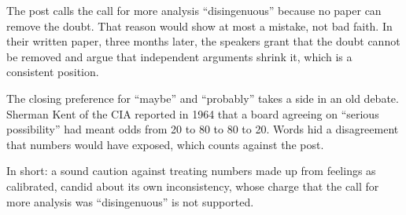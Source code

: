 \begin{afterword}
The post calls the call for more analysis ``disingenuous'' because no paper can remove the doubt. That reason would show at most a mistake, not bad faith. In their written paper, three months later, the speakers grant that the doubt cannot be removed and argue that independent arguments shrink it, which is a consistent position.

The closing preference for ``maybe'' and ``probably'' takes a side in an old debate. Sherman Kent of the CIA reported in 1964 that a board agreeing on ``serious possibility'' had meant odds from 20 to 80 to 80 to 20. Words hid a disagreement that numbers would have exposed, which counts against the post.

In short: a sound caution against treating numbers made up from feelings as calibrated, candid about its own inconsistency, whose charge that the call for more analysis was ``disingenuous'' is not supported.
\end{afterword}
